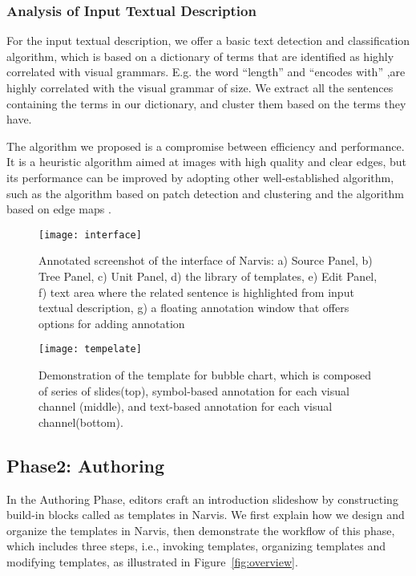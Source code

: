 \subsubsection{Analysis of Input Textual Description}
For the input textual description, we offer a basic text detection and classification algorithm, which is based on a dictionary of terms that are identified as highly correlated with visual grammars. E.g. the word ``length'' and ``encodes with'' ,are highly correlated with the  visual grammar of size. We extract all the sentences containing the terms in our dictionary, and cluster them based on the terms they have.

The algorithm we proposed is a compromise between efficiency and performance. It is a heuristic algorithm aimed at images with high quality and clear edges, but its performance can be improved by adopting other well-established algorithm, such as the algorithm based on patch detection and clustering \cite{savva_revision:_2011} and the algorithm based on edge maps \cite{huang2003model}.


    
    
\begin{figure}
 \centering %
 \texttt{[image: interface]}
 \caption{Annotated screenshot of the interface of Narvis: a) Source Panel, b) Tree Panel, c) Unit Panel, d) the library of templates, e) Edit Panel, f) text area where the related sentence is highlighted from input textual description, g) a floating annotation window that offers options for adding annotation}
 \label{fig:interface}
\end{figure}


\begin{figure}
 \centering 
 \texttt{[image: tempelate]}
 \caption{Demonstration of the template for bubble chart, which is composed of series of slides(top), symbol-based annotation for each visual channel (middle), and text-based annotation for each visual channel(bottom). }
 \label{fig:template}
\end{figure}


\subsection{Phase2: Authoring}
In the Authoring Phase, editors craft an introduction slideshow by constructing build-in blocks called as templates in Narvis. We first explain how we design and organize the templates in Narvis, then demonstrate the workflow of this phase, which includes three steps, i.e., invoking templates, organizing templates and modifying templates, as illustrated in Figure~\ref{fig:overview}. 

